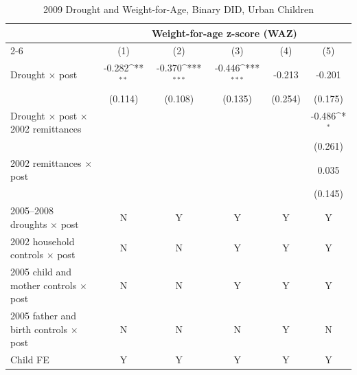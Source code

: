 \documentclass[12pt]{article}
\def\sym#1{\ifmmode^{#1}\else\(^{#1}\)\fi}
\begin{document}
\begin{longtable}{l*{5}{c}}
\caption{2009 Drought and Weight-for-Age, Binary DID, Urban Children}\\
\toprule
 & \multicolumn{5}{c}{Weight-for-age z-score (WAZ)}\\
\cmidrule(lr){2-6}
            &\multicolumn{1}{c}{(1)}         &\multicolumn{1}{c}{(2)}         &\multicolumn{1}{c}{(3)}         &\multicolumn{1}{c}{(4)}         &\multicolumn{1}{c}{(5)}         \\
\midrule
Drought \ensuremath{\times} post&      -0.282\sym{**} &      -0.370\sym{***}&      -0.446\sym{***}&      -0.213         &      -0.201         \\
            &     (0.114)         &     (0.108)         &     (0.135)         &     (0.254)         &     (0.175)         \\
Drought \ensuremath{\times} post \ensuremath{\times} 2002 remittances&                     &                     &                     &                     &      -0.486\sym{*}  \\
            &                     &                     &                     &                     &     (0.261)         \\
2002 remittances \ensuremath{\times} post&                     &                     &                     &                     &       0.035         \\
            &                     &                     &                     &                     &     (0.145)         \\
\midrule
2005--2008 droughts \ensuremath{\times} post&           N         &           Y         &           Y         &           Y         &           Y         \\
2002 household controls \ensuremath{\times} post&           N         &           N         &           Y         &           Y         &           Y         \\
2005 child and mother controls \ensuremath{\times} post&           N         &           N         &           Y         &           Y         &           Y         \\
2005 father and birth controls \ensuremath{\times} post&           N         &           N         &           N         &           Y         &           N         \\
Child FE    &           Y         &           Y         &           Y         &           Y         &           Y         \\

\end{longtable}
\end{document}
